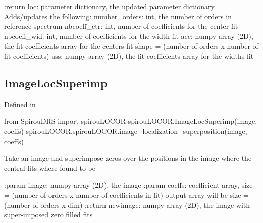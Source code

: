 \begin{minipage}{\textwidth}
\begin{pythondocstring}
:return loc: parameter dictionary, the updated parameter dictionary
        Adds/updates the following:
            number_orders: int, the number of orders in reference spectrum
            nbcoeff_ctr: int, number of coefficients for the center fit
            nbcoeff_wid: int, number of coefficients for the width fit
            acc: numpy array (2D), the fit coefficients array for
                  the centers fit
                  shape = (number of orders x number of fit coefficients)
            ass: numpy array (2D), the fit coefficients array for
                  the widths fit
\end{pythondocstring}
\end{minipage}

\noindent\begin{minipage}{\textwidth}
\subsection{ImageLocSuperimp}

Defined in \spirouLOCOR{}

\begin{pythonbox}
from SpirouDRS import spirouLOCOR
spirouLOCOR.ImageLocSuperimp(image, coeffs)
spirouLOCOR.spirouLOCOR.image_localization_superposition(image, coeffs)
\end{pythonbox}

\begin{pythondocstring}
Take an image and superimpose zeros over the positions in the image where
the central fits where found to be

:param image: numpy array (2D), the image
:param coeffs: coefficient array,
               size = (number of orders x number of coefficients in fit)
               output array will be size = (number of orders x dim)
:return newimage: numpy array (2D), the image with super-imposed zero filled
                  fits
\end{pythondocstring}
\end{minipage}

